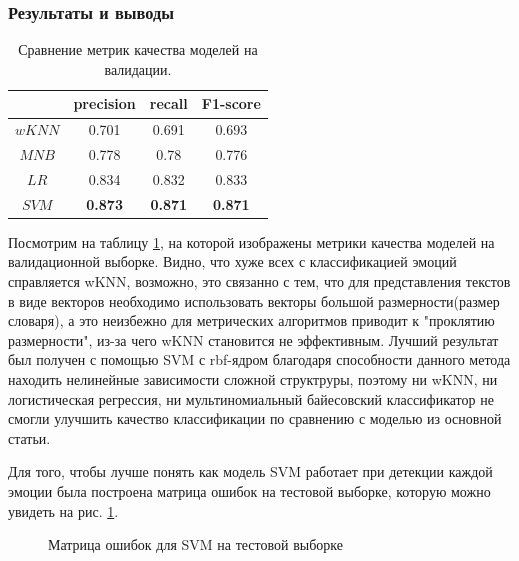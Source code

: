 \documentclass{article}
\begin{document}
\subsubsection{Результаты и выводы}
\begin{table}[h!]
\centering
\begin{tabular}{|c|c|c|c|}
	\hline
		& precision & recall & F1-score\\
	\hline
		$wKNN$ & 0.701 &  0.691 & 0.693\\
	\hline
		$MNB$  &  0.778 & 0.78 & 0.776\\
	\hline
		$LR$ & 0.834 &  0.832 & 0.833 \\
	\hline
		$SVM$ & \bfseries{0.873} & \bfseries{0.871} & \bfseries{0.871} \\
	\hline
\end{tabular}
\caption{Сравнение метрик качества моделей на валидации.}
\label{table:table1}
\end{table}
Посмотрим на таблицу \ref{table:table1}, на которой изображены метрики качества моделей на валидационной выборке. Видно, что хуже всех с классификацией эмоций справляется wKNN, возможно, это связанно с тем, что для представления текстов в виде векторов необходимо использовать векторы большой размерности(размер словаря), а это неизбежно для метрических алгоритмов приводит к "проклятию размерности"{}, из-за чего wKNN становится не эффективным. Лучший результат был получен с помощью SVM с rbf-ядром благодаря способности данного метода находить нелинейные зависимости сложной структруры, поэтому ни wKNN, ни логистическая регрессия, ни мультиномиальный байесовский классификатор не смогли улучшить качество классификации по сравнению с моделью из основной статьи.

Для того, чтобы лучше понять как  модель SVM работает при детекции каждой эмоции была построена матрица ошибок на тестовой выборке, которую можно увидеть на рис. \ref{eq:conf_matr1}.
\begin{figure}[h]
	\caption{\centering Матрица ошибок для SVM на тестовой выборке}
	\label{eq:conf_matr1}
\end{figure}
\end{document}
